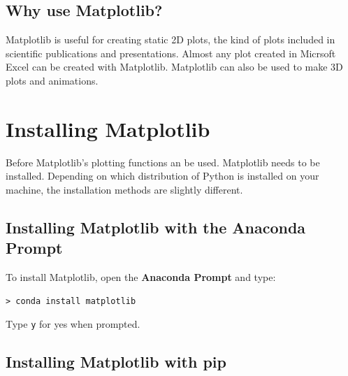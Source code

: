 \documentclass{book}
\begin{document}
    
        \subsection{Why use Matplotlib?}\label{why-use-matplotlib}
    




    
        Matplotlib is useful for creating static 2D plots, the kind of plots
included in scientific publications and presentations. Almost any plot
created in Micrsoft Excel can be created with Matplotlib. Matplotlib can
also be used to make 3D plots and animations.
    




    
        \section{Installing Matplotlib}\label{installing-matplotlib}
    




    
        Before Matplotlib's plotting functions an be used. Matplotlib needs to
be installed. Depending on which distribution of Python is installed on
your machine, the installation methods are slightly different.
    




    
        \subsection{Installing Matplotlib with the Anaconda
Prompt}\label{installing-matplotlib-with-the-anaconda-prompt}

To install Matplotlib, open the \textbf{Anaconda Prompt} and type:

\begin{lstlisting}
> conda install matplotlib
\end{lstlisting}

Type \lstinline!y! for yes when prompted.
    




    
        \subsection{\texorpdfstring{Installing Matplotlib with
\textbf{pip}}{Installing Matplotlib with pip}}\label{installing-matplotlib-with-pip}
    
\end{document}
